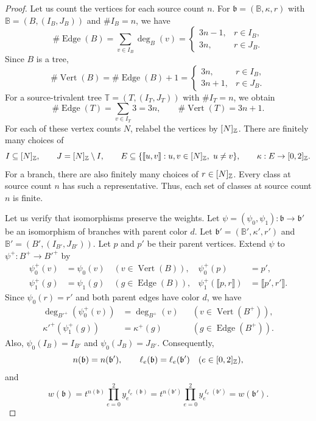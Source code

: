 \begin{proof}
 Let us count the vertices for each source count $n$.
For $\mathfrak b=(\mathbb B,\kappa,r)$ with $\mathbb B=(B,(I_B,J_B))$ and $\#I_B=n$, we have
\[
 \#\operatorname{Edge}(B)=\sum_{v\in I_B}\deg_B(v)
 =\begin{cases}
 3n-1,&r\in I_B,\\
 3n,&r\in J_B.
 \end{cases}
\]
Since $B$ is a tree,
\[
 \#\operatorname{Vert}(B)=\#\operatorname{Edge}(B)+1
 =\begin{cases}
 3n,&r\in I_B,\\
 3n+1,&r\in J_B.
 \end{cases}
\]
For a source-trivalent tree $\mathbb T=(T,(I_T,J_T))$ with $\#I_T=n$, we obtain
\[
 \#\operatorname{Edge}(T)=\sum_{v\in I_T}3=3n,\qquad
 \#\operatorname{Vert}(T)=3n+1.
\]
For each of these vertex counts $N$, relabel the vertices by $[N]_{\mathbb Z}$.
There are finitely many choices of
\[
 I\subseteq[N]_{\mathbb Z},\qquad J=[N]_{\mathbb Z}\setminus I,\qquad
 E\subseteq\{\llbracket u,v\rrbracket:u,v\in[N]_{\mathbb Z},\ u\ne v\},\qquad
 \kappa:E\to[0,2]_{\mathbb Z}.
\]
For a branch, there are also finitely many choices of $r\in[N]_{\mathbb Z}$.
Every class at source count $n$ has such a representative.
Thus, each set of classes at source count $n$ is finite.

Let us verify that isomorphisms preserve the weights.
Let $\psi=(\psi_0,\psi_1):\mathfrak b\to\mathfrak b'$ be an isomorphism of branches with parent color $d$.
Let $\mathfrak b'=(\mathbb B',\kappa',r')$ and $\mathbb B'=(B',(I_{B'},J_{B'}))$.
Let $p$ and $p'$ be their parent vertices.
Extend $\psi$ to $\psi^+:B^+\to B'^+$ by
\[
\begin{aligned}
 \psi_0^+(v)&=\psi_0(v)\quad(v\in\operatorname{Vert}(B)),&
 \psi_0^+(p)&=p',\\
 \psi_1^+(g)&=\psi_1(g)\quad(g\in\operatorname{Edge}(B)),&
 \psi_1^+(\llbracket p,r\rrbracket)&=\llbracket p',r'\rrbracket.
\end{aligned}
\]
Since $\psi_0(r)=r'$ and both parent edges have color $d$, we have
\[
\begin{aligned}
 \deg_{B'^+}(\psi_0^+(v))&=\deg_{B^+}(v)
 &&(v\in\operatorname{Vert}(B^+)),\\
 \kappa'^+(\psi_1^+(g))&=\kappa^+(g)
 &&(g\in\operatorname{Edge}(B^+)).
\end{aligned}
\]
Also, $\psi_0(I_B)=I_{B'}$ and $\psi_0(J_B)=J_{B'}$.
Consequently,
\[
 n(\mathfrak b)=n(\mathfrak b'),\qquad
 \ell_e(\mathfrak b)=\ell_e(\mathfrak b')\quad(e\in[0,2]_{\mathbb Z}),
\]
and
\[
 w(\mathfrak b)
 =t^{n(\mathfrak b)}\prod_{e=0}^2y_e^{\ell_e(\mathfrak b)}
 =t^{n(\mathfrak b')}\prod_{e=0}^2y_e^{\ell_e(\mathfrak b')}
 =w(\mathfrak b').
\]


\end{proof}

